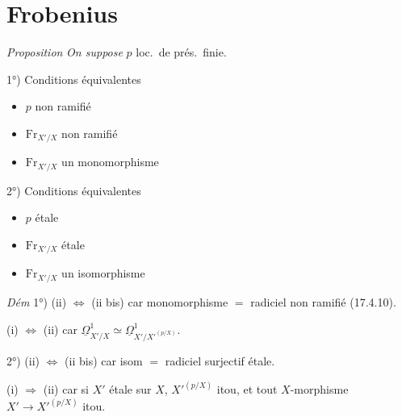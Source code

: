 \documentclass[11pt,a4paper]{article}
\begin{document}
\section*{Frobenius}





\emph{Proposition} \emph{On suppose} $p$ loc.\ de prés.\ finie.

1°) Conditions équivalentes
\begin{itemize}
  \item[(i)] $p$ non ramifié
  \item[(ii)] $\mathrm{Fr}_{X'/X}$ non ramifié
  \item[(ii bis)] $\mathrm{Fr}_{X'/X}$ un monomorphisme
\end{itemize}

2°) Conditions équivalentes
\begin{itemize}
  \item[(i)] $p$ étale
  \item[(ii)] $\mathrm{Fr}_{X'/X}$ étale
  \item[(ii bis)] $\mathrm{Fr}_{X'/X}$ un isomorphisme
\end{itemize}

\emph{Dém} 1°) (ii) $\Longleftrightarrow$ (ii bis) car monomorphisme $=$
radiciel non ramifié (17.4.10).

(i) $\Longleftrightarrow$ (ii) car
$\underline{\Omega}^1_{X'/X} \simeq \underline{\Omega}^1_{X'/X'^{(p/X)}}$.

2°) (ii) $\Longleftrightarrow$ (ii bis) car isom $=$ radiciel surjectif
étale.

(i) $\Longrightarrow$ (ii) car si $X'$ étale sur $X$, $X'^{(p/X)}$ itou, et
tout $X$-morphisme $X' \to X'^{(p/X)}$ itou.
\end{document}
